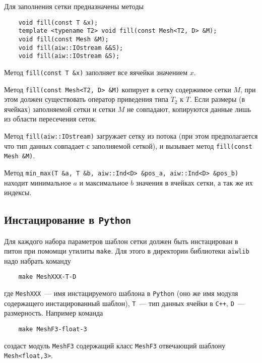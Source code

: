 Для заполнения сетки предназначены методы		
\begin{verbatim}		
    void fill(const T &x);
    template <typename T2> void fill(const Mesh<T2, D> &M);
    void fill(const Mesh &M);
    void fill(aiw::IOstream &&S);
    void fill(aiw::IOstream &S);
\end{verbatim}
Метод \verb'fill(const T &x)' заполняет все яячейки значением $x$.

Метод \verb'fill(const Mesh<T2, D> &M)' копирует в сетку содержимое сетки $M$, при этом должен существовать оператор
приведения типа $T_2$ к $T$. Если размеры (в ячейках) заполняемой сетки и сетки $M$ не совпадают, копируются данные лишь из области пересечения 
сеток.

Метод \verb'fill(aiw::IOstream)' загружает сетку из потока (при этом предполагается что тип данных 
совпадает с заполняемой сеткой), и вызывает метод \verb'fill(const Mesh &M)'.

Метод \verb'min_max(T &a, T &b, aiw::Ind<D> &pos_a, aiw::Ind<D> &pos_b)' находит минимальное $a$ и максимальное $b$
значения в ячейках сетки, а так же их индексы.

\subsection{Инстацирование в {\tt Python}}
Для каждого набора параметров шаблон сетки должен быть инстацирован в питон при помомщи утилиты \verb'make'.
Для этого в директории библиотеки \verb'aiwlib' надо набрать команду
\begin{verbatim}		
    make MeshXXX-T-D
\end{verbatim}
где \verb'MeshXXX'~--- имя инстацируемого шаблона в \verb'Python' (оно же имя модуля содержащего инстацированный шаблон),
\verb'T'~--- тип данных ячейки в \verb'C++', \verb'D'~--- размерность.
 Например команда 
\begin{verbatim}		
    make MeshF3-float-3
\end{verbatim}
создаст модуль \verb'MeshF3' содержащий класс \verb'MeshF3' отвечающий шаблону \verb'Mesh<float,3>'.

